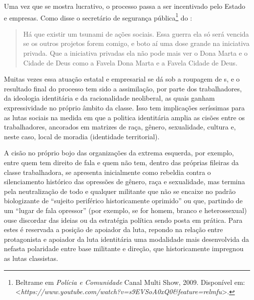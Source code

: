 Uma vez que se mostra lucrativo, o processo passa a ser incentivado pelo
Estado e empresas. Como disse o secretário de segurança
pública\footnote{Beltrame em \emph{Polícia e Comunidade} Canal Multi
  Show, 2009. Disponível em:
  \textless{}\emph{https://www.youtube.com/watch?v=s9EVSoA0xQ0\&feature=relmfu}\textgreater{}.} do :

\begin{quote}
Há que existir um tsunami de ações sociais. Essa guerra ela só será
vencida se os outros projetos forem comigo, e boto aí uma dose grande na
iniciativa privada. Que a iniciativa privadas ela não pode mais ver o
Dona Marta e o Cidade de Deus como a Favela Dona Marta e a Favela Cidade
de Deus.
\end{quote}

Muitas vezes essa atuação estatal e empresarial se dá sob a roupagem de
s, e o resultado final do processo tem sido a assimilação, por parte
dos trabalhadores, da ideologia identitária e da racionalidade
neoliberal, as quais ganham expressividade no próprio âmbito da classe.
Isso tem implicações seríssimas para as lutas sociais na medida em que a
politica identitária amplia as cisões entre os trabalhadores, ancorados
em matrizes de raça, gênero, sexualidade, cultura e, neste caso, local
de moradia (identidade territorial).

A cisão no próprio bojo das organizações da extrema esquerda, por
exemplo, entre quem tem direito de fala e quem não tem, dentro das
próprias fileiras da classe trabalhadora, se apresenta inicialmente como
rebeldia contra o silenciamento histórico das opressões de gênero, raça
e sexualidade, mas termina pela neutralização de todo e qualquer
militante que não se encaixe no padrão biologizante de ``sujeito
periférico historicamente oprimido'' ou que, partindo de um ``lugar de
fala opressor'' (por exemplo, se for homem, branco e heterossexual) ouse
discordar das ideias ou da estratégia política sendo posta em prática.
Para estes é reservada a posição de apoiador da luta, repondo na relação
entre protagonista e apoiador da luta identitária uma modalidade mais
desenvolvida da nefasta polaridade entre base militante e direção, que
historicamente impregnou as lutas classistas.

